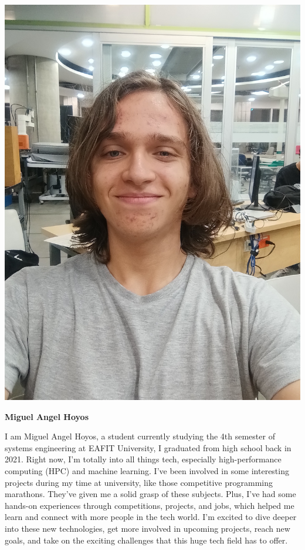 \documentclass[11pt,a4paper,twocolumn]{article}
\begin{document}
    \begin{center}
        \includegraphics[width = .45\linewidth]{Images/Miguel Hoyos.jpeg}
    \end{center}
    \begin{center}
        \textbf{Miguel Angel Hoyos}
    \end{center}
    I am Miguel Angel Hoyos, a student currently studying the 4th semester of systems engineering at EAFIT University, I graduated from high school back in 2021. Right now, I'm totally into all things tech, especially high-performance computing (HPC) and machine learning. I've been involved in some interesting projects during my time at university, like those competitive programming marathons. They've given me a solid grasp of these subjects. Plus, I've had some hands-on experiences through competitions, projects, and jobs, which helped me learn and connect with more people in the tech world. I'm excited to dive deeper into these new technologies, get more involved in upcoming projects, reach new goals, and take on the exciting challenges that this huge tech field has to offer.
\end{document}
